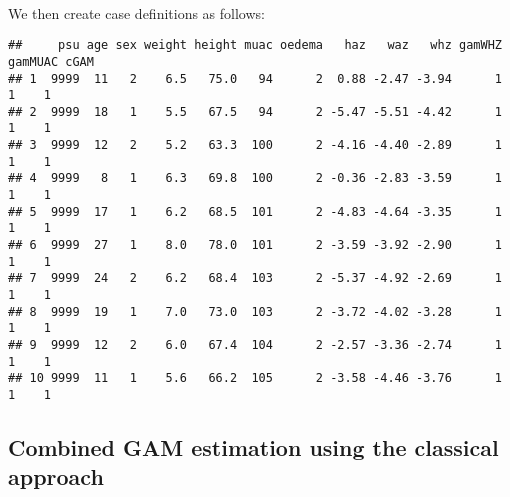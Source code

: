 \documentclass[12pt,a4paper]{article}
\newenvironment{Shaded}{}{}
\newcommand{\CommentTok}[1]{\textcolor[rgb]{0.00,0.50,0.00}{#1}}
\newcommand{\DecValTok}[1]{#1}
\newcommand{\KeywordTok}[1]{\textcolor[rgb]{0.00,0.00,1.00}{#1}}
\newcommand{\NormalTok}[1]{#1}
\newcommand{\OperatorTok}[1]{#1}
\newcommand{\StringTok}[1]{\textcolor[rgb]{0.00,0.50,0.50}{#1}}
\begin{document}
~

We then create case definitions as follows:

\begin{Shaded}
\end{Shaded}

\begin{verbatim}
##     psu age sex weight height muac oedema   haz   waz   whz gamWHZ gamMUAC cGAM
## 1  9999  11   2    6.5   75.0   94      2  0.88 -2.47 -3.94      1       1    1
## 2  9999  18   1    5.5   67.5   94      2 -5.47 -5.51 -4.42      1       1    1
## 3  9999  12   2    5.2   63.3  100      2 -4.16 -4.40 -2.89      1       1    1
## 4  9999   8   1    6.3   69.8  100      2 -0.36 -2.83 -3.59      1       1    1
## 5  9999  17   1    6.2   68.5  101      2 -4.83 -4.64 -3.35      1       1    1
## 6  9999  27   1    8.0   78.0  101      2 -3.59 -3.92 -2.90      1       1    1
## 7  9999  24   2    6.2   68.4  103      2 -5.37 -4.92 -2.69      1       1    1
## 8  9999  19   1    7.0   73.0  103      2 -3.72 -4.02 -3.28      1       1    1
## 9  9999  12   2    6.0   67.4  104      2 -2.57 -3.36 -2.74      1       1    1
## 10 9999  11   1    5.6   66.2  105      2 -3.58 -4.46 -3.76      1       1    1
\end{verbatim}

\hypertarget{combined-gam-estimation-using-the-classical-approach}{%
\subsection{Combined GAM estimation using the classical approach}\label{combined-gam-estimation-using-the-classical-approach}}
\end{document}
